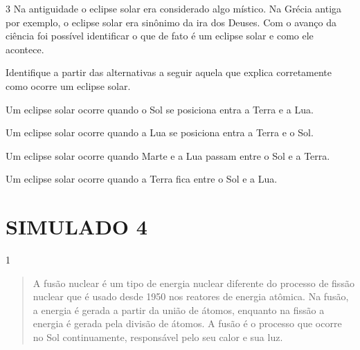 \num{3}
  Na antiguidade o eclipse solar era considerado algo místico. Na Grécia
  antiga por exemplo, o eclipse solar era sinônimo da ira dos Deuses.
  Com o avanço da ciência foi possível identificar o que de fato é um
  eclipse solar e como ele acontece.


Identifique a partir das alternativas a seguir aquela que explica
corretamente como ocorre um eclipse solar.

\begin{escolha}
\item
  Um eclipse solar ocorre quando o Sol se posiciona entra a Terra e a
  Lua.
\item
  Um eclipse solar ocorre quando a Lua se posiciona entra a Terra e o
  Sol.
\item
  Um eclipse solar ocorre quando Marte e a Lua passam entre o Sol e a
  Terra.
\item
  Um eclipse solar ocorre quando a Terra fica entre o Sol e a Lua.
\end{escolha}


\chapter{SIMULADO 4}

\num{1}
\begin{quote}
  A fusão nuclear é um tipo de energia nuclear diferente do processo
  de fissão nuclear que é usado desde 1950 nos reatores de energia
  atômica. Na fusão, a energia é gerada a partir da união de átomos,
  enquanto na fissão a energia é gerada pela divisão de átomos. A fusão
  é o processo que ocorre no Sol continuamente, responsável pelo seu
  calor e sua luz.

\end{quote}

